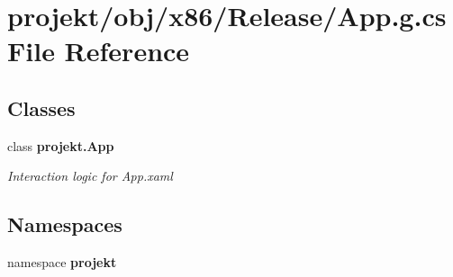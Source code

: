 \section{projekt/obj/x86/\+Release/\+App.g.\+cs File Reference}
\label{x86_2Release_2App_8g_8cs}
\subsection*{Classes}
\begin{DoxyCompactItemize}
\item 
class \textbf{ projekt.\+App}
\begin{DoxyCompactList}\small\item\em Interaction logic for App.\+xaml \end{DoxyCompactList}\end{DoxyCompactItemize}
\subsection*{Namespaces}
\begin{DoxyCompactItemize}
\item 
namespace \textbf{ projekt}
\end{DoxyCompactItemize}
